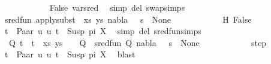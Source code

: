 \begin{isabellebody}
\ \ \ \ \ \ \ \ \ \ \isamarkupfalse%
\ False\ var{\isacharunderscore}{\kern0pt}{}{\isacharunderscore}{\kern0pt}sred\ \isamarkupfalse%
\ {\isacharparenleft}{\kern0pt}simp\ del{\isacharcolon}{\kern0pt}\ swap{\isachardot}{\kern0pt}simps{\isacharparenright}{\kern0pt}\isanewline
\ \ \ \ \ \ \ \ \isamarkupfalse%
\ {\isachardoublequoteopen}sred{\isacharunderscore}{\kern0pt}fun\ {\isacharparenleft}{\kern0pt}apply{\isacharunderscore}{\kern0pt}subst\ {\isacharquery}{\kern0pt}{\isasymsigma}\ {\isacharparenleft}{\kern0pt}xs{\isacharcomma}{\kern0pt}\ ys{\isacharparenright}{\kern0pt}{\isacharcomma}{\kern0pt}\ nabla{\isacharcomma}{\kern0pt}\ {\isacharquery}{\kern0pt}{\isasymsigma}\ {\isasymbullet}\ s{\isacharparenright}{\kern0pt}\ {\isacharequal}{\kern0pt}\ None{\isachardoublequoteclose}\isanewline
\ \ \ \ \ \ \ \ \ \ \isamarkupfalse%
\ H\ False\ \isamarkupfalse%
\ {\isacartoucheopen}t{}\ {\isacharequal}{\kern0pt}\ Paar\ u{}\ u{}{\isacartoucheclose}\ {\isacartoucheopen}t{}\ {\isacharequal}{\kern0pt}\ Susp\ pi\ X{\isacartoucheclose}\ \isamarkupfalse%
\ {\isacharparenleft}{\kern0pt}simp\ del{\isacharcolon}{\kern0pt}\ sred{\isacharunderscore}{\kern0pt}fun{\isachardot}{\kern0pt}simps{\isacharparenright}{\kern0pt}\isanewline
\ \ \ \ \ \ \ \ \isamarkupfalse%
\ \isamarkupfalse%
\ {\isachardoublequoteopen}{\isasymexists}{\isasymsigma}\ Q{\isachardot}{\kern0pt}\ {\isacharparenleft}{\kern0pt}{\isacharparenleft}{\kern0pt}t{}\ {\isasymapprox}{\isacharquery}{\kern0pt}\ t{}{\isacharparenright}{\kern0pt}\ {\isacharhash}{\kern0pt}\ xs{\isacharcomma}{\kern0pt}\ ys{\isacharparenright}{\kern0pt}\ {\isasymturnstile}\ {\isasymsigma}\ {\isasymleadsto}\ Q\ {\isasymand}\ sred{\isacharunderscore}{\kern0pt}fun\ {\isacharparenleft}{\kern0pt}Q{\isacharcomma}{\kern0pt}\ nabla{\isacharcomma}{\kern0pt}\ {\isasymsigma}\ {\isasymbullet}\ s{\isacharparenright}{\kern0pt}\ {\isacharequal}{\kern0pt}\ None{\isachardoublequoteclose}\isanewline
\ \ \ \ \ \ \ \ \ \ \isamarkupfalse%
\ step\ \isamarkupfalse%
\ {\isacartoucheopen}t{}\ {\isacharequal}{\kern0pt}\ Paar\ u{}\ u{}{\isacartoucheclose}\ {\isacartoucheopen}t{}\ {\isacharequal}{\kern0pt}\ Susp\ pi\ X{\isacartoucheclose}\ \isamarkupfalse%
\ blast\isanewline
\ \ \ \ \ \ \ \ \isamarkupfalse%

\end{isabellebody}
